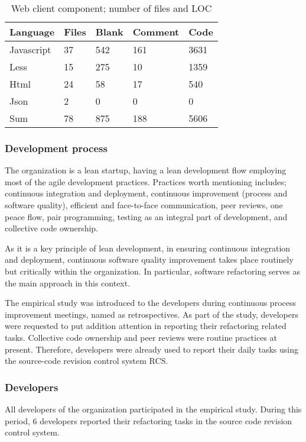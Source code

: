 \documentclass[english,12pt,a4paper,pdftex,sci,utf8]{aaltothesis}
\begin{document}
\begin{table}[ht!]
\centering
\caption{Web client component; number of files and \gls{LOC}}
\label{table:webLoc}
    \begin{tabular}{ |p{3cm} p{2cm} p{2cm} p{2cm} p{2cm}|  }
     \hline
     Language&Files&Blank&Comment&Code\\
     \hline\hline
     Javascript   & 37    &542&   161&3631\\
     Less&   15  & 275   &10 & 1359\\
     Html &24 & 58&  17&540\\
     Json    &2 & 0&  0 & 0\\
     \hline\hline
     Sum&78&875&188&5606\\
     \hline
    \end{tabular}
\end{table}
\subsubsection*{Development process} \label{process}
The organization is a lean startup, having a lean development flow employing most of the agile development practices. Practices worth mentioning includes; continuous integration and deployment, continuous improvement (process and software quality), efficient and face-to-face communication, peer reviews, one peace flow, pair programming, testing as an integral part of development, and collective code ownership.

As it is a key principle of lean development, in ensuring continuous integration and deployment, continuous software quality improvement takes place routinely but critically within the organization. In particular, software refactoring serves as the main approach in this context.  

The empirical study was introduced to the developers during continuous process improvement meetings, named as retrospectives. As part of the study, developers were requested to put addition attention in reporting their refactoring related tasks. Collective code ownership and peer reviews were routine practices at present. Therefore, developers were already used to report their daily tasks using the source-code revision control system \gls{RCS}. 

\subsubsection*{Developers} \label{developers}
All developers of the organization participated in the empirical study. During this period, 6 developers reported their refactoring tasks in the source code revision control system.
\end{document}
